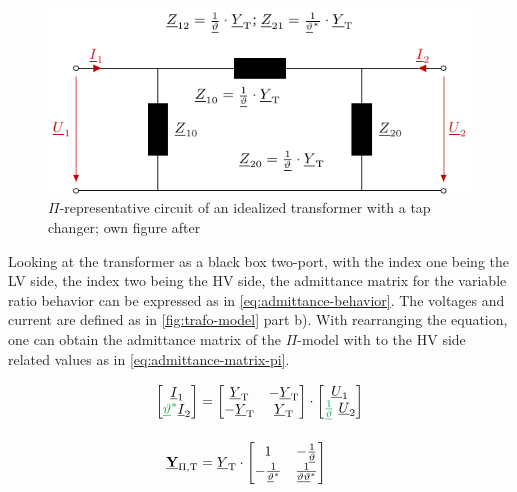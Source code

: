 \begin{figure}%
    \centering
    \includegraphics[width=.7\textwidth]{tikz_graphics/images/transformer_pi.pdf}
    \caption[$\Pi$-representative circuit of an idealized transformer with a tap changer]{$\Pi$-representative circuit of an idealized transformer with a tap changer; own figure after \autocite{milano_2010,burlakin_2024}}
    \label{fig:pi-transformer}
\end{figure}

Looking at the transformer as a black box two-port, with the index one being the \acs{LV} side, the index two being the \acs{HV} side, the admittance matrix for the variable ratio behavior can be expressed as in \autoref{eq:admittance-behavior}. 
The voltages and current are defined as in \autoref{fig:trafo-model} part b). 
With rearranging the equation, one can obtain the admittance matrix of the $\Pi$-model with to the \acs{HV} side related values as in \autoref{eq:admittance-matrix-pi}. \autocite{milano_2010,burlakin_2024}

\begin{align}
    \begin{bmatrix}
        \underline{I}_1 \\ {\color{ees_green}\underline{\vartheta}^*} \underline{I}_2
    \end{bmatrix}&= 
    \begin{bmatrix}
        \underline{Y}_\mathrm{T} & -\underline{Y}_\mathrm{T} \\
        -\underline{Y}_\mathrm{T} & \underline{Y}_\mathrm{T}
    \end{bmatrix} \cdot
    \begin{bmatrix}
        \underline{U}_1 \\ {\color{ees_green}\frac{1}{\underline{\vartheta}}}~\underline{U}_2
    \end{bmatrix} \label{eq:admittance-behavior} \\[12pt]
    \underline{\mab{Y}}_\mathrm{\Pi,T}&=\underline{Y}_\mathrm{T} \cdot
    \begin{bmatrix}
        1 & -\frac{1}{\underline{\vartheta}} \\
        -\frac{1}{\underline{\vartheta}^*} & \frac{1}{\underline{\vartheta}\underline{\vartheta}^*} 
    \end{bmatrix} \label{eq:admittance-matrix-pi}
\end{align}

